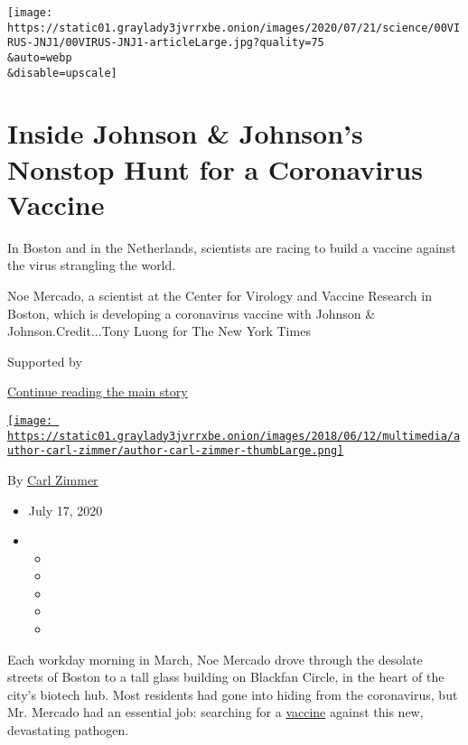 \texttt{[image: https://static01.graylady3jvrrxbe.onion/images/2020/07/21/science/00VIRUS-JNJ1/00VIRUS-JNJ1-articleLarge.jpg?quality=75\\\&auto=webp\\\&disable=upscale]}

\hypertarget{inside-johnson--johnsons-nonstop-hunt-for-a-coronavirus-vaccine}{%
\section{Inside Johnson \& Johnson's Nonstop Hunt for a Coronavirus
Vaccine}\label{inside-johnson--johnsons-nonstop-hunt-for-a-coronavirus-vaccine}}

In Boston and in the Netherlands, scientists are racing to build a
vaccine against the virus strangling the world.

Noe Mercado, a scientist at the Center for Virology and Vaccine Research
in Boston, which is developing a coronavirus vaccine with Johnson \&
Johnson.Credit...Tony Luong for The New York Times

Supported by

\protect\hyperlink{after-sponsor}{Continue reading the main story}

\href{https://www.nytimes3xbfgragh.onion/by/carl-zimmer}{\texttt{[image: https://static01.graylady3jvrrxbe.onion/images/2018/06/12/multimedia/author-carl-zimmer/author-carl-zimmer-thumbLarge.png]}}

By \href{https://www.nytimes3xbfgragh.onion/by/carl-zimmer}{Carl Zimmer}

\begin{itemize}
\item
  July 17, 2020
\item
  \begin{itemize}
  \item
  \item
  \item
  \item
  \item
  \end{itemize}
\end{itemize}

Each workday morning in March, Noe Mercado drove through the desolate
streets of Boston to a tall glass building on Blackfan Circle, in the
heart of the city's biotech hub. Most residents had gone into hiding
from the coronavirus, but Mr. Mercado had an essential job: searching
for a
\href{https://www.nytimes3xbfgragh.onion/2020/07/20/world/covid-coronavirus-vaccine.html}{vaccine}
against this new, devastating pathogen.


